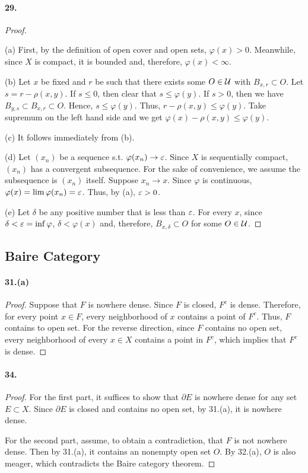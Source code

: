\paragraph{29.}
\begin{proof}
  $\,$\par
  (a) First, by the definition of open cover and open sets, $\varphi(x) > 0$.
  Meanwhile, since $X$ is compact, it is bounded and, therefore, 
  $\varphi(x) < \infty$.
  
  (b) Let $x$ be fixed and $r$ be such that there exists some $O\in \mathcal{U}$
  with $B_{x, r}\subset O$. Let $s = r - \rho(x, y)$. If $s \le 0$, then
  clear that $s \le \varphi(y)$. If $s > 0$, then we have $B_{y, s}
  \subset B_{x, r} \subset O$. Hence, $s \le \varphi(y)$. Thus, 
  $r - \rho(x, y) \le \varphi(y)$. Take supremum on the left hand side and we
  get $\varphi(x) - \rho(x, y) \le \varphi(y)$.
  
  (c) It follows immediately from (b).
  
  (d) Let $(x_n)$ be a sequence s.t. $\varphi(x_n) \to \varepsilon$. Since $X$ is
  sequentially compact, $(x_n)$ has a convergent subsequence. For the sake of 
  convenience, we assume the subsequence is $(x_n)$ itself. Suppose $x_n
  \to x$. Since $\varphi$ is continuous, $\varphi(x) = \lim\varphi(x_n) = 
  \varepsilon$. Thus, by (a), $\varepsilon > 0$.
  
  (e) Let $\delta$ be any positive number that is less than $\varepsilon$. For every
  $x$, since $\delta < \varepsilon = \inf\varphi$, $\delta < \varphi(x)$ and,
  therefore, $B_{x, \delta} \subset O$ for some $O \in \mathcal{U}$.
\end{proof}

\subsection{Baire Category}
\paragraph{31.(a)}
\begin{proof}
  Suppose that $F$ is nowhere dense. Since $F$ is closed, $F^c$ is dense.
  Therefore, for every point $x\in F$, every neighborhood of $x$ contains a
  point of $F^c$. Thus, $F$ contains to open set. For the reverse direction, 
  since $F$ contains no open set, every neighborhood of every $x\in X$ contains
  a point in $F^c$, which implies that $F^c$ is dense.
\end{proof}

\paragraph{34.}
\begin{proof}
  For the first part, it suffices to show that $\partial E$ is nowhere dense
  for any set $E \subset X$. Since $\partial E$ is closed and contains no open
  set, by 31.(a), it is nowhere dense.
  
  For the second part, assume, to obtain a contradiction, that $F$ is not
  nowhere dense. Then by 31.(a), it contains an nonempty open set $O$. By
  32.(a), $O$ is also meager, which contradicts the Baire category theorem. 
\end{proof}

